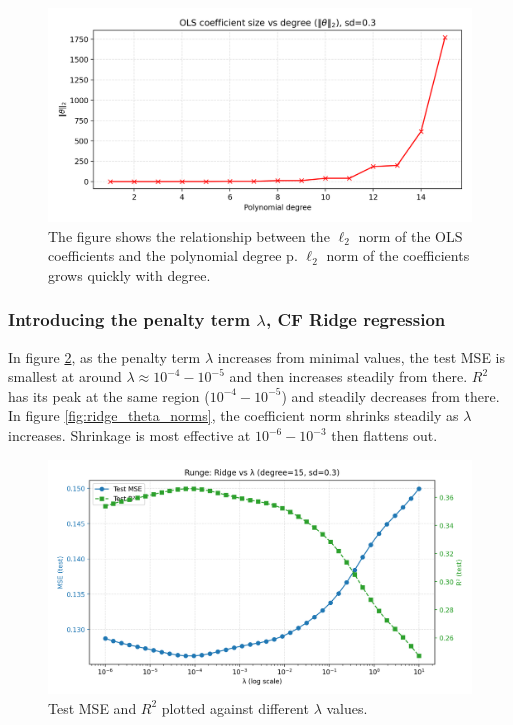 \documentclass[amssymb,twocolumn,aps,floatfix]{revtex4-2}
\begin{document}
\begin{figure}[t]
    \centering
    \includegraphics[width=1\linewidth]{Project-1/Figures/runge_ols_theta_norms_vs_degree.png}
    \caption{The figure shows the relationship between the $\ell_2$ norm of the OLS coefficients and the polynomial degree p. $\ell_2$ norm of the coefficients grows quickly with degree.}
    \label{fig:norms_vs_degree}
\end{figure}

\subsubsection{Introducing the penalty term $\lambda$, CF Ridge regression}

In figure \ref{fig:ridge_mse_lambda}, as the penalty term $\lambda$ increases from minimal values, the test MSE is smallest at around $\lambda \approx 10^{-4}-10^{-5}$ and then increases steadily from there. $R^2$ has its peak at the same region ($10^{-4}-10^{-5}$) and steadily decreases from there. In figure \ref{fig:ridge_theta_norms}, the coefficient norm shrinks steadily as $\lambda$ increases. Shrinkage is most effective at $10^{-6}-10^{-3}$ then flattens out. 

\begin{figure}[t]
    \centering
    \includegraphics[width=1\linewidth]{Project-1/Figures/runge_ridge_mse_r2_vs_lambda.png}
    \caption{Test MSE and $R^2$ plotted against different $\lambda$ values.}
    \label{fig:ridge_mse_lambda}
\end{figure}
\end{document}
